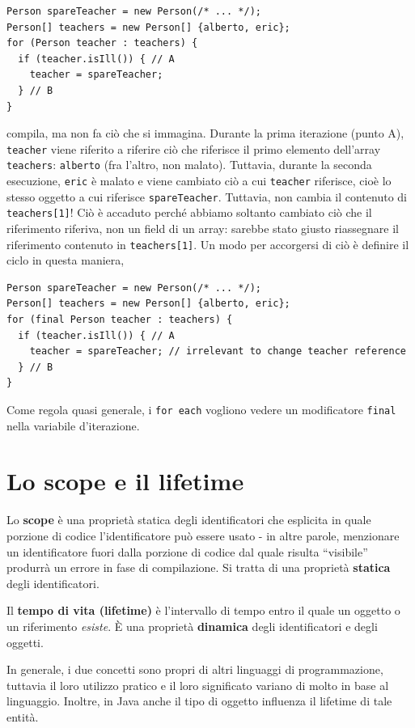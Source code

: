 \documentclass[\fontsizeclass,twocolumn]{\classname}
\theoremstyle{definition}
\theoremstyle{definition}
\begin{document}
\begin{lstlisting}
Person spareTeacher = new Person(/* ... */);
Person[] teachers = new Person[] {alberto, eric};
for (Person teacher : teachers) {
  if (teacher.isIll()) { // A
    teacher = spareTeacher;
  } // B
}
\end{lstlisting}

compila, ma non fa ciò che si immagina. Durante la prima iterazione (punto A),
\texttt{teacher} viene riferito a riferire ciò che riferisce il primo elemento
dell'array \texttt{teachers}: \texttt{alberto} (fra l'altro, non malato).
Tuttavia, durante la seconda esecuzione, \texttt{eric} è malato e viene
cambiato ciò a cui \texttt{teacher} riferisce, cioè lo stesso oggetto a cui
riferisce \texttt{spareTeacher}. Tuttavia, non cambia il contenuto di
\texttt{teachers[1]}! Ciò è accaduto perché abbiamo soltanto cambiato ciò che
il riferimento riferiva, non un field di un array: sarebbe stato giusto
riassegnare il riferimento contenuto in \texttt{teachers[1]}. Un modo per
accorgersi di ciò è definire il ciclo in questa maniera,

\begin{lstlisting}
Person spareTeacher = new Person(/* ... */);
Person[] teachers = new Person[] {alberto, eric};
for (final Person teacher : teachers) {
  if (teacher.isIll()) { // A
    teacher = spareTeacher; // irrelevant to change teacher reference
  } // B
}
\end{lstlisting}

Come regola quasi generale, i \texttt{for each} vogliono vedere un modificatore
\texttt{final} nella variabile d'iterazione.

\section{Lo scope e il lifetime}

Lo \textbf{scope} è una proprietà statica degli identificatori che esplicita in
quale porzione di codice l'identificatore può essere usato \-- in altre parole,
menzionare un identificatore fuori dalla porzione di codice dal quale risulta
``visibile'' produrrà un errore in fase di compilazione. Si tratta di una
proprietà \textbf{statica} degli identificatori.

Il \textbf{tempo di vita (lifetime)} è l'intervallo di tempo entro il quale un
oggetto o un riferimento \emph{esiste}. È una proprietà \textbf{dinamica} degli
identificatori e degli oggetti.

In generale, i due concetti sono propri di altri linguaggi di programmazione,
tuttavia il loro utilizzo pratico e il loro significato variano di molto in
base al linguaggio. Inoltre, in Java anche il tipo di oggetto influenza il
lifetime di tale entità.
\end{document}
